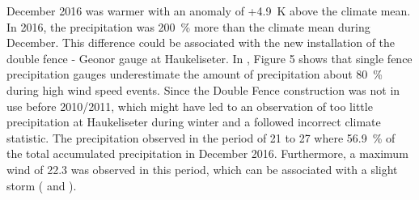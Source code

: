 December 2016 was warmer with an anomaly of +\SI{4.9}{\kelvin} above the climate mean. 
In 2016, the precipitation was \SI{200}{\percent} more than the climate mean during December. This difference could be associated with the new installation of the double fence - Geonor gauge at Haukeliseter. In \citet{wolff_derivation_2015}, Figure 5 shows that single fence precipitation gauges underestimate the amount of precipitation about \SI{80}{\percent} during high wind speed events. Since the Double Fence construction was not in use before 2010/2011, which might have led to an observation of too little precipitation at Haukeliseter during winter and a followed incorrect climate statistic.
The precipitation observed in the period of \num{21} to \SI{27}{\dec} where \SI{56.9}{\percent} of the total accumulated precipitation in December 2016. Furthermore, a maximum wind of \SI{22.3}{\mPs} was observed in this period, which can be associated with a slight storm ( and ).
